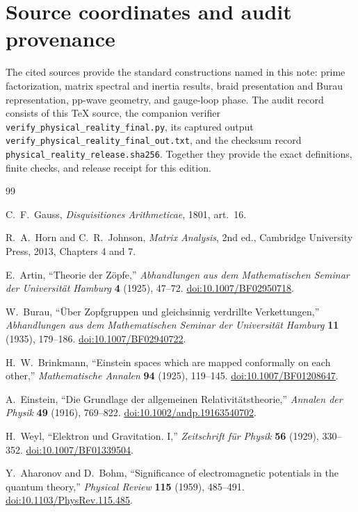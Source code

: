 \documentclass[10pt]{article}
\theoremstyle{remark}
\begin{document}
\section*{Source coordinates and audit provenance}

The cited sources provide the standard constructions named in this note:
prime factorization, matrix spectral and inertia results, braid presentation
and Burau representation, pp-wave geometry, and gauge-loop phase.  The audit
record consists of this TeX source, the companion verifier
\nolinkurl{verify_physical_reality_final.py}, its captured output
\nolinkurl{verify_physical_reality_final_out.txt}, and the checksum record
\nolinkurl{physical_reality_release.sha256}.  Together they provide the exact
definitions, finite checks, and release receipt for this edition.

\begin{thebibliography}{99}

C.~F.~Gauss, \emph{Disquisitiones Arithmeticae}, 1801, art.~16.

R.~A.~Horn and C.~R.~Johnson, \emph{Matrix Analysis}, 2nd ed., Cambridge
University Press, 2013, Chapters 4 and 7.

E.~Artin, ``Theorie der Z\"opfe,'' \emph{Abhandlungen aus dem Mathematischen
Seminar der Universit\"at Hamburg} \textbf{4} (1925), 47--72.
\href{https://doi.org/10.1007/BF02950718}{doi:10.1007/BF02950718}.

W.~Burau, ``\"Uber Zopfgruppen und gleichsinnig verdrillte Verkettungen,''
\emph{Abhandlungen aus dem Mathematischen Seminar der Universit\"at Hamburg}
\textbf{11} (1935), 179--186.
\href{https://doi.org/10.1007/BF02940722}{doi:10.1007/BF02940722}.

H.~W.~Brinkmann, ``Einstein spaces which are mapped conformally on each
other,'' \emph{Mathematische Annalen} \textbf{94} (1925), 119--145.
\href{https://doi.org/10.1007/BF01208647}{doi:10.1007/BF01208647}.

A.~Einstein, ``Die Grundlage der allgemeinen Relativit\"atstheorie,''
\emph{Annalen der Physik} \textbf{49} (1916), 769--822.
\href{https://doi.org/10.1002/andp.19163540702}{doi:10.1002/andp.19163540702}.

H.~Weyl, ``Elektron und Gravitation. I,'' \emph{Zeitschrift f\"ur Physik}
\textbf{56} (1929), 330--352.
\href{https://doi.org/10.1007/BF01339504}{doi:10.1007/BF01339504}.

Y.~Aharonov and D.~Bohm, ``Significance of electromagnetic potentials in the
quantum theory,'' \emph{Physical Review} \textbf{115} (1959), 485--491.
\href{https://doi.org/10.1103/PhysRev.115.485}{doi:10.1103/PhysRev.115.485}.

\end{thebibliography}
\end{document}
